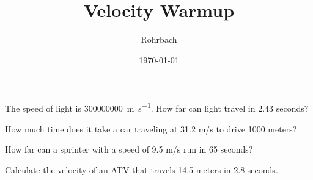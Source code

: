 \documentclass[10pt]{exam}
\title{Velocity Warmup}
\author{Rohrbach}
\date{\today}
\begin{document}
\maketitle

\begin{questions}

  \question 
    The speed of light is \SI{300000000}{\meter\per\second}.  How far can light travel in 2.43 seconds?
    
    \ku\vs

  \question
    How much time does it take a car traveling at 31.2 m/s to drive 1000 meters?
    
    \ku\vs

  \pagebreak

  \question 
    How far can a sprinter with a speed of 9.5 m/s run in 65 seconds?
    
    \ku\vs

  \question 
    Calculate the velocity of an ATV that travels 14.5 meters in 2.8 seconds.
    
    \ku\vs


  
\end{questions}
\end{document}

